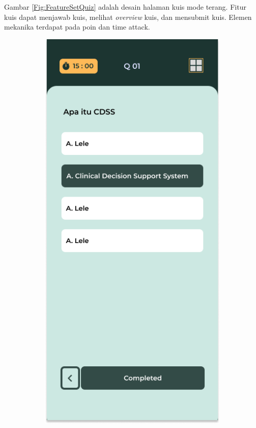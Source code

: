 Gambar \ref*{Fig:FeatureSetQuiz} adalah desain halaman kuis mode terang. 
Fitur kuis dapat menjawab kuis, melihat \textit{overview} kuis, dan mensubmit kuis.
Elemen mekanika terdapat pada poin dan time attack.

\begin{figure}[H]
	\centering
	\begin{subfigure}[b]{0.23\textwidth}
		\centering
	  \includegraphics[width=\linewidth]{contents/chapter-3/images/HF-kuis1-dt.png}

\end{subfigure}
\end{figure}
